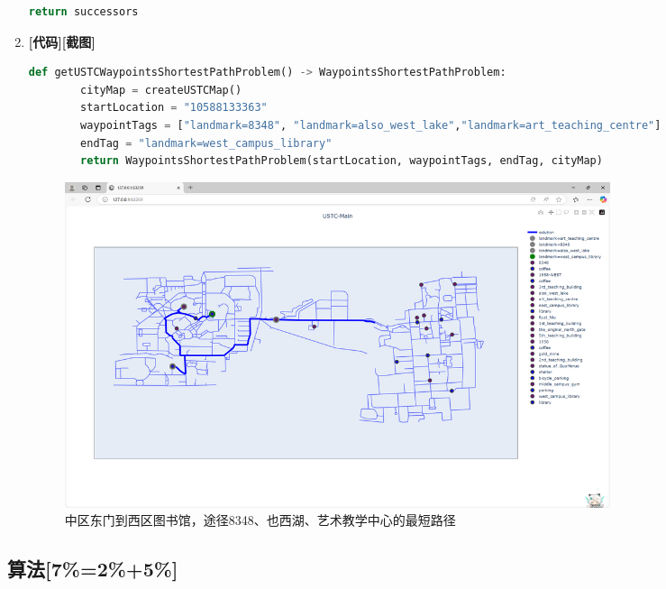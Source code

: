 \documentclass{article}
\begin{document}
\begin{enumerate}[label=(\alph*), start=1]
\begin{lstlisting}[language=Python]
    		return successors
    \end{lstlisting}
    \item \textbf{[代码]}\textbf{[截图]} %
    \begin{lstlisting}[language=Python]
    def getUSTCWaypointsShortestPathProblem() -> WaypointsShortestPathProblem:
    	cityMap = createUSTCMap()
    	startLocation = "10588133363"
    	waypointTags = ["landmark=8348", "landmark=also_west_lake","landmark=art_teaching_centre"]
    	endTag = "landmark=west_campus_library"
    	return WaypointsShortestPathProblem(startLocation, waypointTags, endTag, cityMap)
    \end{lstlisting}
    \begin{figure}[h]
    	\centering
    	\includegraphics[width=0.8\textwidth]{library_to_gate_waytags.png}
    	\caption{中区东门到西区图书馆，途径8348、也西湖、艺术教学中心的最短路径}
    \end{figure}
\end{enumerate}

\subsection{算法[7\%=2\%+5\%]}
\end{document}
